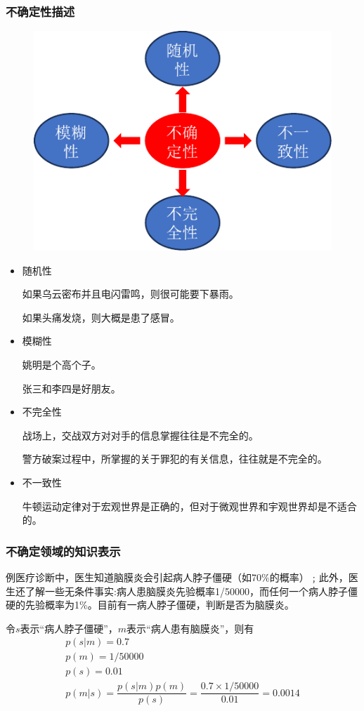 \subsubsection{不确定性描述}
\begin{figure}[htbp]
    \centering
    \includegraphics[scale = 0.7]{image/不确定性.pdf}
\end{figure}
\begin{itemize}
    \item 随机性
    
    如果乌云密布并且电闪雷鸣，则很可能要下暴雨。
    
    如果头痛发烧，则大概是患了感冒。
    \item 模糊性
    
    姚明是个高个子。
    
    张三和李四是好朋友。
    \item 不完全性
    
    战场上，交战双方对对手的信息掌握往往是不完全的。
    
    警方破案过程中，所掌握的关于罪犯的有关信息，往往就是不完全的。
    \item 不一致性
    
    牛顿运动定律对于宏观世界是正确的，但对于微观世界和宇观世界却是不适合的。
\end{itemize}
\subsubsection{不确定领域的知识表示}
\begin{example}
    例医疗诊断中，医生知道脑膜炎会引起病人脖子僵硬（如70\%的概率）﹔此外，医生还了解一些无条件事实:病人患脑膜炎先验概率1/50000，而任何一个病人脖子僵硬的先验概率为1\%。目前有一病人脖子僵硬，判断是否为脑膜炎。

    令$s$表示“病人脖子僵硬”，$m$表示“病人患有脑膜炎”，则有
    \[
        \begin{array}{l}
            p(s|m) = 0.7\\
            p(m) = 1/50000\\
            p(s) = 0.01\\
            p(m|s) = \dfrac{p(s|m)p(m)}{p(s)} = \dfrac{0.7\times 1/50000}{0.01} = 0.0014
        \end{array}
    \]
\end{example}
